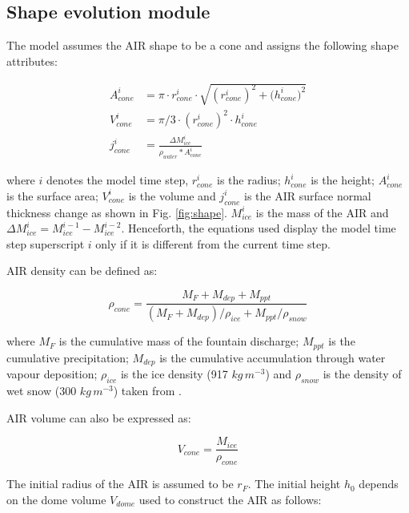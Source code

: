 \subsection{Shape evolution module} \label{sec:shape}

The model assumes the AIR shape to be a cone and assigns the following shape attributes:

\begin{subequations}
	\begin{align}
		\label{eq:A}
		A_{cone}^i & = \pi \cdot r_{cone}^i \cdot \sqrt{{(r_{cone}^i)}^2 + {(h_{cone}^i})^ 2} \\
		\label{eq:V}
		V_{cone}^i & = \pi/3 \cdot {(r_{cone}^i)}^2 \cdot h_{cone}^i                          \\
		\label{eq:thickness}
		j_{cone}^i & =\frac{\Delta M_{ice}^i}{\rho_{water}* A_{cone}^i}
	\end{align}
\end{subequations}

where $i$ denotes the model time step, $r_{cone}^i$ is the radius; $h_{cone}^i$ is the height; $A_{cone}^i$ is
the surface area; $V_{cone}^i$ is the volume and $j_{cone}^i$ is the AIR surface normal thickness change as shown
in Fig. \ref{fig:shape}. $M_{ice}^i$ is the mass of the AIR and $\Delta M_{ice}^i = M_{ice}^{i-1} -
	M_{ice}^{i-2}$. Henceforth, the equations used display the model time step superscript $i$ only if it is different
from the current time step.

AIR density can be defined as:

\begin{equation}
	\rho_{cone} = \frac{M_{F} + M_{dep} + M_{ppt}}{(M_{F} + M_{dep})/\rho_{ice} + M_{ppt}/\rho_{snow}}
\end{equation}

where $M_F$ is the cumulative mass of the fountain discharge; $M_{ppt}$ is the cumulative precipitation;
$M_{dep}$ is the cumulative accumulation through water vapour deposition; $\rho_{ice}$ is the ice density (917
$kg\,m^{-3}$) and $\rho_{snow}$ is the density of wet snow (300 $kg\,m^{-3}$) taken from
\cite{cuffeyPhysicsGlaciers2010} .

AIR volume can also be expressed as:

\begin{equation} V_{cone} =\frac{M_{ice}} {\rho_{cone}} \label{eq:V1} \end{equation}

The initial radius of the AIR is assumed to be $r_F$. The initial height $h_0$ depends on the dome volume
$V_{dome}$ used to construct the AIR as follows:

